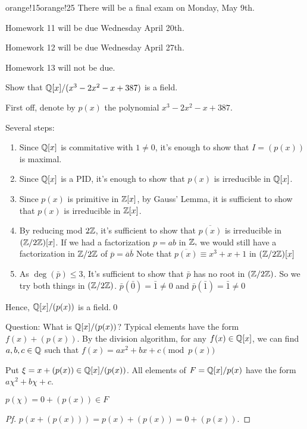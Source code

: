 \documentclass[notes.tex]{subfiles}
\begin{document}
\begin{classnote}{orange!15}{orange!25}
	There will be a final exam on Monday, May 9th.
	
	Homework 11 will be due Wednesday April 20th.

	Homework 12 will be due Wednesday April 27th.

	Homework 13 will not be due.
\end{classnote}

\begin{eg}
	Show that $\mathbb{Q}[x]/(x^3 - 2x^2 - x + 387)$ is a field.

	First off, denote by $p(x)$ the polynomial $x^3 - 2x^2 - x + 387$.

	Several steps:
	\begin{enumerate}
		\item Since $\mathbb{Q}[x]$ is commitative with $1\ne 0$, it's enough to show that $I = (p(x))$ is maximal.
		\item Since $\mathbb{Q}[x]$ is a PID, it's enough to show that $p(x)$ is irreducible in $\mathbb{Q}[x]$.
		\item Since $p(x)$ is primitive in $\mathbb{Z}[x]$, by Gauss' Lemma, it is sufficient to show that $p(x)$ is irreducible in $\mathbb{Z}[x]$.
		\item By reducing mod $2\mathbb{Z}$, it's sufficient to show that $\overline{p(x)}$ is irreducible in $(\mathbb{Z}/2\mathbb{Z})[x]$. If we had a factorization $p = ab$ in $\mathbb{Z},$ we would still have a factorization in $\mathbb{Z}/2\mathbb{Z}$ of $\overline p = \overline a\overline b$
		Note that $\overline{p(x)} \equiv {x^3 + x + 1}$ in $(\mathbb{Z}/2\mathbb{Z})[x]$
		\item As $\deg(\bar{p})\le 3$, It's sufficient to show that $\bar p$ has no root in $(\mathbb{Z}/{2}\mathbb{Z})$. So we try both things in $(\mathbb{Z}/{2}\mathbb{Z})$. $\bar p(\bar 0) = \bar 1\ne 0$ and $\bar p(\bar 1) = \bar1 \ne 0$
	\end{enumerate}
	Hence, $\mathbb{Q}[x]/(p(x))$ is a field.\qed
\end{eg}

Question: What is $\mathbb{Q}[x]/(p(x))$?
Typical elements have the form $f(x) + (p(x))$.
By the division algorithm, for any $f(x) \in \mathbb{Q}[x]$, we can find $a,b,c\in \mathbb{Q}$ such that $f(x) = ax^2 + bx + c \pmod{p(x)}$

Put $\xi = x + (p(x))\in \mathbb{Q}[x]/(p(x))$.
All elements of $F = \mathbb{Q}[x]/p(x)$ have the form $a \chi^2 + b \chi + c$.
\begin{claim}
	$p(\chi) = 0 + (p(x))\in F$
\end{claim}
\begin{proof}[Pf]
	$p(x + (p(x))) = p(x) + (p(x)) = 0 + (p(x))$.
\end{proof}
\end{document}

